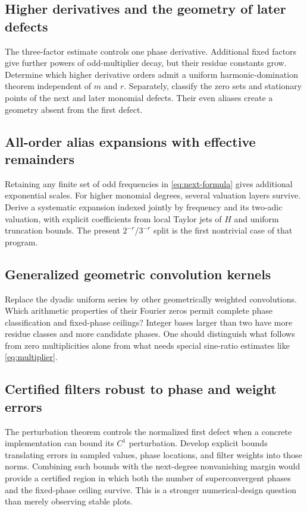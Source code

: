 \documentclass[11pt,a4paper]{article}
\numberwithin{equation}{section}
\theoremstyle{plain}
\theoremstyle{definition}
\theoremstyle{remark}
\begin{document}
\subsection{Higher derivatives and the geometry of later defects}

The three-factor estimate controls one phase derivative. Additional fixed
factors give further powers of odd-multiplier decay, but their residue
constants grow. Determine which higher derivative orders admit a uniform
harmonic-domination theorem independent of $m$ and $r$. Separately,
classify the zero sets and stationary points of the next and later
monomial defects. Their even aliases create a geometry absent from the
first defect.

\subsection{All-order alias expansions with effective remainders}

Retaining any finite set of odd frequencies in \eqref{eq:next-formula}
gives additional exponential scales. For higher monomial degrees, several
valuation layers survive. Derive a systematic expansion indexed jointly
by frequency and its two-adic valuation, with explicit coefficients from
local Taylor jets of $H$ and uniform truncation bounds. The present
$2^{-r}$/$3^{-r}$ split is the first nontrivial case of that program.

\subsection{Generalized geometric convolution kernels}

Replace the dyadic uniform series by other geometrically weighted
convolutions. Which arithmetic properties of their Fourier zeros permit
complete phase classification and fixed-phase ceilings? Integer bases
larger than two have more residue classes and more candidate phases.
One should distinguish what follows from zero multiplicities alone from
what needs special sine-ratio estimates like \eqref{eq:multiplier}.

\subsection{Certified filters robust to phase and weight errors}

The perturbation theorem controls the normalized first defect when a
concrete implementation can bound its $C^1$ perturbation. Develop explicit
bounds translating errors in sampled values, phase locations, and filter
weights into those norms. Combining such bounds with the next-degree
nonvanishing margin would provide a certified region in which both the
number of superconvergent phases and the fixed-phase ceiling survive.
This is a stronger numerical-design question than merely observing stable
plots.
\end{document}
